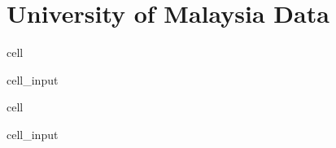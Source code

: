 \documentclass[letterpaper,10pt,english]{jupyterBook}
\begin{document}
\section{University of Malaysia Data}
\label{\detokenize{notebooks/replicating_paper:university-of-malaysia-data}}
\begin{sphinxuseclass}{cell}\begin{sphinxVerbatimInput}

\begin{sphinxuseclass}{cell_input}
\begin{sphinxVerbatim}[commandchars=\\\{\}]
  

  
\end{sphinxVerbatim}

\end{sphinxuseclass}\end{sphinxVerbatimInput}

\end{sphinxuseclass}
\begin{sphinxuseclass}{cell}\begin{sphinxVerbatimInput}

\begin{sphinxuseclass}{cell_input}
\begin{sphinxVerbatim}[commandchars=\\\{\}]
  \PYG{p}{[}\PYG{p}{[} \PYG{p}{]}\PYG{p}{]}
\end{sphinxVerbatim}

\end{sphinxuseclass}\end{sphinxVerbatimInput}

\end{sphinxuseclass}
\end{document}
